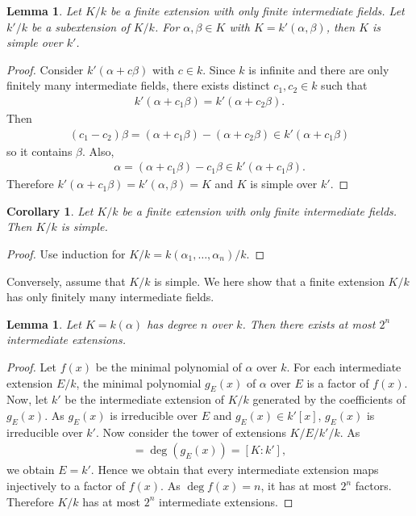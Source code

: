 \documentclass[12pt]{report}
\theoremstyle{plain}
\newtheorem{corollary}[theorem]{Corollary}
\newtheorem{lemma}[theorem]{Lemma}
\theoremstyle{remark}
\theoremstyle{definition}
\begin{document}
\begin{lemma}
    Let $K/k$ be a finite extension with only finite intermediate fields. Let $k'/k$ be a subextension of $K/k$. For $\alpha,\beta\in K$ with $K=k'(\alpha,\beta)$, then $K$ is simple over $k'$.
\end{lemma}
\begin{proof}
    Consider $k'(\alpha+c\beta)$ with $c\in k$. Since $k$ is infinite and there are only finitely many intermediate fields, there exists distinct $c_1,c_2\in k$ such that
    \begin{align*}
        k'(\alpha+c_1\beta) = k'(\alpha+c_2\beta).
    \end{align*}
    Then
    \begin{align*}
        (c_1-c_2)\beta= (\alpha+c_1\beta)-(\alpha+c_2\beta) \in  k'(\alpha+c_1\beta)
    \end{align*}
    so it contains $\beta$. Also,
    \begin{align*}
        \alpha = (\alpha+c_1\beta) - c_1\beta\in k'(\alpha+c_1\beta).
    \end{align*}
    Therefore $k'(\alpha+c_1\beta) = k'(\alpha,\beta) = K$ and $K$ is simple over $k'$.
\end{proof}

\begin{corollary}
    Let $K/k$ be a finite extension with only finite intermediate fields. Then $K/k$ is simple.
\end{corollary}
\begin{proof}
    Use induction for $K/k = k(\alpha_1,\dots,\alpha_n)/k$.
\end{proof}

Conversely, assume that $K/k$ is simple. We here show that a finite extension $K/k$ has only finitely many intermediate fields.

\begin{lemma}
    Let $K=k(\alpha)$ has degree $n$ over $k$. Then there exists at most $2^n$ intermediate extensions.
\end{lemma}
\begin{proof}
    Let $f(x)$ be the minimal polynomial of $\alpha$ over $k$. For each intermediate extension $E/k$, the minimal polynomial $g_E(x)$ of $\alpha$ over $E$ is a factor of $f(x)$. Now, let $k'$ be the intermediate extension of $K/k$ generated by the coefficients of $g_E(x)$. As $g_E(x)$ is irreducible over $E$ and $g_E(x)\in k'[x]$, $g_E(x)$ is irreducible over $k'$. Now consider the tower of extensions $K/E/k'/k$. As
    \begin{align*}
        [K:E] = \deg (g_E(x)) = [K:k'],
    \end{align*}
    we obtain $E=k'$. Hence we obtain that every intermediate extension maps injectively to a factor of $f(x)$. As $\deg f(x)=n$, it has at most $2^n$ factors. Therefore $K/k$ has at most $2^n$ intermediate extensions.
\end{proof}
\end{document}
